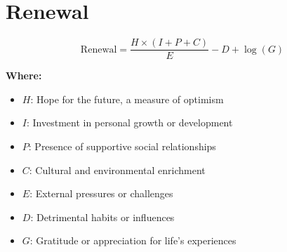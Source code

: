\chapter{Renewal}

\begin{equation}
\text{Renewal} = \frac{H \times (I + P + C)}{E} - D + \log(G)
\end{equation}

\textbf{Where:}

\begin{itemize}
    \item $H$: Hope for the future, a measure of optimism
    \item $I$: Investment in personal growth or development
    \item $P$: Presence of supportive social relationships
    \item $C$: Cultural and environmental enrichment
    \item $E$: External pressures or challenges
    \item $D$: Detrimental habits or influences
    \item $G$: Gratitude or appreciation for life's experiences
\end{itemize}